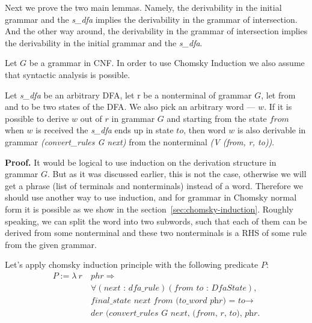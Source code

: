 Next we prove the two main lemmas. Namely, the derivability in the initial grammar and the \textit{s\_dfa} implies the derivability in the grammar of intersection. And the other way around, the derivability in the grammar of intersection implies the derivability in the initial grammar and the \textit{s\_dfa}.

Let $G$ be a grammar in CNF. In order to use Chomsky Induction we also assume that syntactic analysis is possible. 


\begin{theorem}
    Let \textit{s\_dfa} be an arbitrary DFA, let r be a nonterminal of grammar $G$, let from and to be two states of the DFA. We also pick an arbitrary word --- $w$. If it is possible to derive $w$ out of $r$ in grammar $G$ and starting from the state $from$ when $w$ is received the \textit{s\_dfa} ends up in state $to$, then word $w$ is also derivable in grammar \textit{(convert\_rules G next)} from the nonterminal \textit{(V (from, r, to))}.
\end{theorem}

\textbf{Proof.}
It would be logical to use induction on the derivation structure in grammar $G$. But as it was discussed earlier, this is not the case, otherwise we will get a phrase (list of terminals and nonterminals) instead of a word. Therefore we should use another way to use induction, and for grammar in Chomsky normal form it is possible as we show in the section~\ref{sec:chomsky-induction}. Roughly speaking, we can split the word into two subwords, such that each of them can be derived from some nonterminal and these two nonterminals is a RHS of some rule from the given grammar.

Let's apply chomsky induction principle with the following predicate $P$:
\begin{align*}
  P :=  \lambda \ r \ & phr \Rightarrow \\
        &\forall (\textit{next : dfa\_rule}) (\textit{from to : DfaState}), \\
        &\textit{final\_state next from (to\_word phr) = to} \to \\
        &\textit{der (convert\_rules G next, (from, r, to), phr}.
\end{align*}

